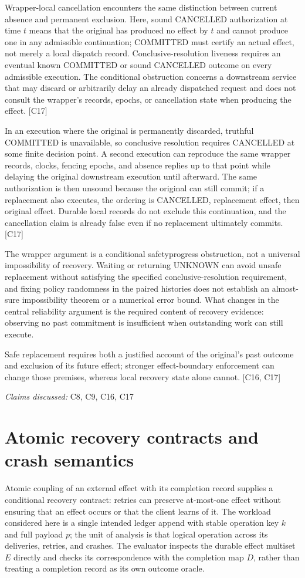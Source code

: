 \documentclass[11pt]{article}
\begin{document}
Wrapper-local cancellation encounters the same distinction between current absence and permanent exclusion. Here, sound CANCELLED authorization at time $t$ means that the original has produced no effect by $t$ and cannot produce one in any admissible continuation; COMMITTED must certify an actual effect, not merely a local dispatch record. Conclusive-resolution liveness requires an eventual known COMMITTED or sound CANCELLED outcome on every admissible execution. The conditional obstruction concerns a downstream service that may discard or arbitrarily delay an already dispatched request and does not consult the wrapper's records, epochs, or cancellation state when producing the effect. [C17]

In an execution where the original is permanently discarded, truthful COMMITTED is unavailable, so conclusive resolution requires CANCELLED at some finite decision point. A second execution can reproduce the same wrapper records, clocks, fencing epochs, and absence replies up to that point while delaying the original downstream execution until afterward. The same authorization is then unsound because the original can still commit; if a replacement also executes, the ordering is CANCELLED, replacement effect, then original effect. Durable local records do not exclude this continuation, and the cancellation claim is already false even if no replacement ultimately commits. [C17]

The wrapper argument is a conditional safety\textendash{}progress obstruction, not a universal impossibility of recovery. Waiting or returning UNKNOWN can avoid unsafe replacement without satisfying the specified conclusive-resolution requirement, and fixing policy randomness in the paired histories does not establish an almost-sure impossibility theorem or a numerical error bound. What changes in the central reliability argument is the required content of recovery evidence: observing no past commitment is insufficient when outstanding work can still execute.

Safe replacement requires both a justified account of the original's past outcome and exclusion of its future effect; stronger effect-boundary enforcement can change those premises, whereas local recovery state alone cannot. [C16, C17]

\textit{Claims discussed: }C8, C9, C16, C17
\section{Atomic recovery contracts and crash semantics}
Atomic coupling of an external effect with its completion record supplies a conditional recovery contract: retries can preserve at-most-one effect without ensuring that an effect occurs or that the client learns of it. The workload considered here is a single intended ledger append with stable operation key $k$ and full payload $p$; the unit of analysis is that logical operation across its deliveries, retries, and crashes. The evaluator inspects the durable effect multiset $E$ directly and checks its correspondence with the completion map $D$, rather than treating a completion record as its own outcome oracle.
\end{document}
